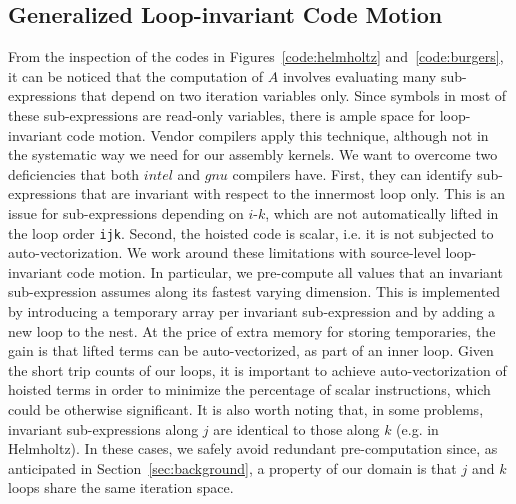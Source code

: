 \documentclass[conference]{IEEEtran}
\begin{document}
\subsection{Generalized Loop-invariant Code Motion}
\label{sec:code-transf-licm}
From the inspection of the codes in Figures~\ref{code:helmholtz} and~\ref{code:burgers}, it can be noticed that the computation of $A$ involves evaluating many sub-expressions that depend on two iteration variables only. Since symbols in most of these sub-expressions are read-only variables, there is ample space for loop-invariant code motion. Vendor compilers apply this technique, although not in the systematic way we need for our assembly kernels. We want to overcome two deficiencies that both $intel$ and $gnu$ compilers have. First, they can identify sub-expressions that are invariant with respect to the innermost loop only. This is an issue for sub-expressions depending on $i$-$k$, which are not automatically lifted in the loop order \texttt{ijk}. Second, the hoisted code is scalar, i.e. it is not subjected to auto-vectorization. We work around these limitations with source-level loop-invariant code motion. In particular, we pre-compute all values that an invariant sub-expression assumes along its fastest varying dimension. This is implemented by introducing a temporary array per invariant sub-expression and by adding a new loop to the nest. At the price of extra memory for storing temporaries, the gain is that lifted terms can be auto-vectorized, as part of an inner loop. Given the short trip counts of our loops, it is important to achieve auto-vectorization of hoisted terms in order to minimize the percentage of scalar instructions, which could be otherwise significant. It is also worth noting that, in some problems, invariant sub-expressions along $j$ are identical to those along $k$ (e.g. in Helmholtz). In these cases, we safely avoid redundant pre-computation since, as anticipated in Section~\ref{sec:background}, a property of our domain is that $j$ and $k$ loops share the same iteration space.
\end{document}
